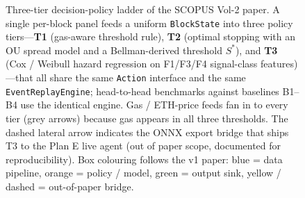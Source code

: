 \begin{figure}[t]
{%
  }%
  \caption{Three-tier decision-policy ladder of the SCOPUS Vol-2 paper.
    A single per-block panel feeds a uniform \texttt{BlockState} into
    three policy tiers---\textbf{T1} (gas-aware threshold rule),
    \textbf{T2} (optimal stopping with an OU spread model and a
    Bellman-derived threshold $S^{*}$), and \textbf{T3} (Cox / Weibull
    hazard regression on F1/F3/F4 signal-class features)---that all
    share the same \texttt{Action} interface and the same
    \texttt{EventReplayEngine}; head-to-head benchmarks against
    baselines B1--B4 use the identical engine. Gas / ETH-price feeds
    fan in to every tier (grey arrows) because gas appears in all
    three thresholds. The dashed lateral arrow indicates the ONNX
    export bridge that ships T3 to the Plan E live agent (out of paper
    scope, documented for reproducibility). Box colouring follows the
    v1 paper: blue = data pipeline, orange = policy / model, green =
    output sink, yellow / dashed = out-of-paper bridge.}
  \label{fig:t1t2t3-ladder}
\end{figure}
